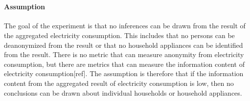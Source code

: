 \\
\\
\textbf{Assumption}
\\
\\
The goal of the experiment is that no inferences can be drawn from the result of the aggregated electricity consumption. This includes that no persons can be deanonymized from the result or that no household appliances can be identified from the result. There is no metric that can measure anonymity from electricity consumption, but there are metrics that can measure the information content of electricity consumption[ref]. The assumption is therefore that if the information content from the aggregated result of electricity consumption is low, then no conclusions can be drawn about individual households or household appliances.
\\
\\
